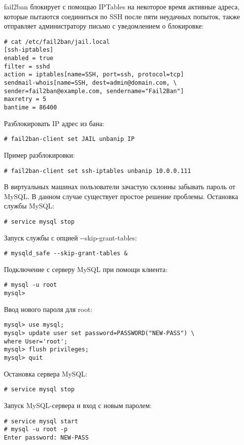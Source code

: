 fail2ban блокирует с помощью IPTables на некоторое время активные адреса, которые пытаются соединиться по SSH после пяти неудачных попыток, также отправляет администратору письмо с уведомлением о блокировке:
\begin{lstlisting}
# cat /etc/fail2ban/jail.local
[ssh-iptables]
enabled = true
filter = sshd
action = iptables[name=SSH, port=ssh, protocol=tcp]
sendmail-whois[name=SSH, dest=admin@domain.com, \
sender=fail2ban@example.com, sendername="Fail2Ban"]
maxretry = 5
bantime = 86400
\end{lstlisting}

Разблокировать IP адрес из бана:
\begin{lstlisting}
# fail2ban-client set JAIL unbanip IP
\end{lstlisting}

Пример разблокировки:
\begin{lstlisting}
# fail2ban-client set ssh-iptables unbanip 10.0.0.111
\end{lstlisting}

В виртуальных машинах пользователи зачастую склонны забывать пароль от MySQL.
В данном случае существует простое решение проблемы.
Остановка службы MySQL:
\begin{lstlisting}
# service mysql stop
\end{lstlisting}

Запуск службы с опцией -{}-skip-grant-tables:
\begin{lstlisting}
# mysqld_safe --skip-grant-tables &
\end{lstlisting}

Подключение с серверу MySQL при помощи клиента:
\begin{lstlisting}
# mysql -u root
mysql>
\end{lstlisting}

Ввод нового пароля для root:
\begin{lstlisting}
mysql> use mysql;
mysql> update user set password=PASSWORD("NEW-PASS") \
where User='root';
mysql> flush privileges;
mysql> quit
\end{lstlisting}

Остановка сервера MySQL:
\begin{lstlisting}
# service mysql stop
\end{lstlisting}

Запуск MySQL-сервера и вход с новым паролем:
\begin{lstlisting}
# service mysql start
# mysql -u root -p
Enter password: NEW-PASS
\end{lstlisting}

